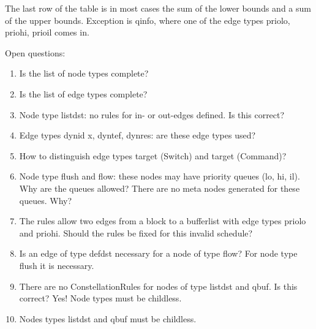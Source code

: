 \begin{table}
The last row of the table is in most cases the sum of the lower bounds and a sum of the upper bounds. Exception is qinfo, where one of the edge types priolo, priohi, prioil comes in.
\end{table}

Open questions:
\begin{enumerate}
\item Is the list of node types complete?
\item Is the list of edge types complete?
\item Node type listdst: no rules for in- or out-edges defined. Is this correct?
\item Edge types dynid x, dyntef, dynres: are these edge types used?
\item How to distinguish edge types target (Switch) and target (Command)?
\item Node type flush and flow: these nodes may have priority queues (lo, hi, il). Why are the queues allowed?
There are no meta nodes generated for these queues. Why?
\item The rules allow two edges from a block to a bufferlist with edge types priolo and priohi.
Should the rules be fixed for this invalid schedule?
\item Is an edge of type defdst necessary for a node of type flow? For node type flush it is necessary.
\item There are no ConstellationRules for nodes of type listdst and qbuf. Is this correct? Yes! Node types must be childless.
\item Nodes types listdst and qbuf must be childless.
\end{enumerate}

